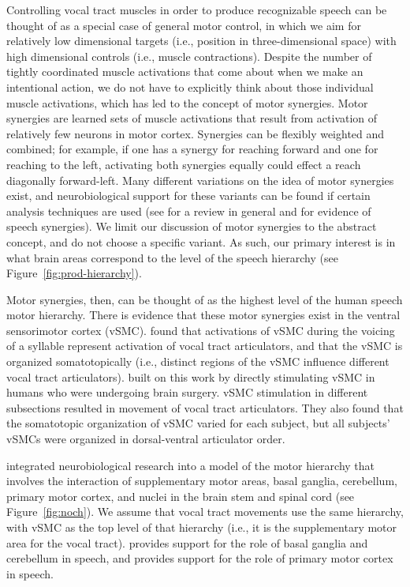 Controlling vocal tract muscles
in order to produce recognizable speech
can be thought of as a special case of
general motor control,
in which we aim for relatively
low dimensional targets
(i.e., position in three-dimensional space)
with high dimensional controls
(i.e., muscle contractions).
Despite the number of tightly coordinated
muscle activations that come about
when we make an intentional action,
we do not have to explicitly
think about those individual muscle activations,
which has led to the concept
of motor synergies.
Motor synergies are learned sets of
muscle activations that result
from activation of relatively few
neurons in motor cortex.
Synergies can be flexibly weighted
and combined;
for example, if one has a synergy
for reaching forward and one for
reaching to the left,
activating both synergies
equally could effect
a reach diagonally forward-left.
Many different variations
on the idea of motor synergies exist,
and neurobiological support
for these variants
can be found if certain
analysis techniques are used
(see \citet{tresch2009}
for a review in general
and \citet{smith2004,smith2006}
for evidence of speech synergies).
We limit our discussion
of motor synergies to the abstract concept,
and do not choose a specific variant.
As such, our primary interest
is in what brain areas correspond
to the level of the speech hierarchy
(see Figure~\ref{fig:prod-hierarchy}).

Motor synergies, then,
can be thought of as the highest level
of the human speech motor hierarchy.
There is evidence that these motor synergies
exist in the ventral sensorimotor cortex (vSMC).
\citet{bouchard2013} found that activations
of vSMC during the voicing of a syllable
represent activation of vocal tract articulators,
and that the vSMC is organized somatotopically
(i.e., distinct regions of the vSMC
influence different vocal tract articulators).
\citet{breshears2015} built on this work
by directly stimulating vSMC in humans
who were undergoing brain surgery.
vSMC stimulation in different subsections
resulted in movement of vocal tract articulators.
They also found that the somatotopic organization
of vSMC varied for each subject,
but all subjects' vSMCs were organized
in dorsal-ventral articulator order.

\citet{dewolf2010} integrated neurobiological research
into a model of the motor hierarchy
that involves the interaction of
supplementary motor areas,
basal ganglia, cerebellum,
primary motor cortex,
and nuclei in the brain stem and spinal cord
(see Figure~\ref{fig:noch}).
We assume that vocal tract movements
use the same hierarchy,
with vSMC as the top level of that hierarchy
(i.e., it is the supplementary motor area
for the vocal tract).
\citet{wildgruber2001} provides support
for the role of basal ganglia
and cerebellum in speech,
and \citet{brown2009}
provides support for
the role of primary motor cortex
in speech.

